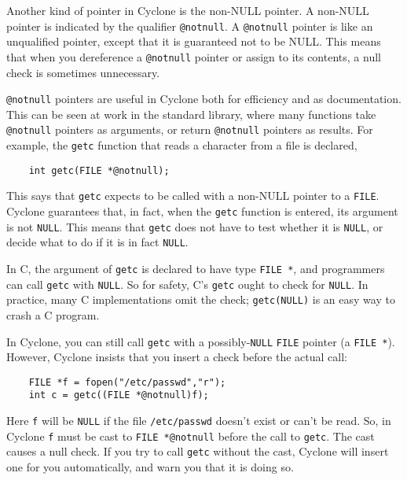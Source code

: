 Another kind of pointer in Cyclone is the non-NULL pointer.
A non-NULL pointer is indicated by the qualifier \texttt{@notnull}.  A
\texttt{@notnull} pointer is like an unqualified pointer, except that it is
guaranteed not to be NULL\@.  This means that when you dereference a
\texttt{@notnull} pointer or assign to its contents, a null check is
sometimes unnecessary.

\texttt{@notnull} pointers are useful in Cyclone both for efficiency and as
documentation.  This can be seen at work in the standard library,
where many functions take \texttt{@notnull} pointers as arguments, or return
\texttt{@notnull} pointers as results.  For example, the \texttt{getc}
function that reads a character from a file is declared,
\begin{verbatim}
    int getc(FILE *@notnull);
\end{verbatim}
This says that \texttt{getc} expects to be called with a non-NULL
pointer to a \texttt{FILE}\@.  Cyclone guarantees that, in fact, when
the \texttt{getc} function is entered, its argument is not \texttt{NULL}.  
This means that \texttt{getc} does not have to test whether it is 
\texttt{NULL}, or decide what to do if it is in fact \texttt{NULL}\@.

In C, the argument of \texttt{getc} is declared to have type
\texttt{FILE *}, and programmers can call \texttt{getc} with
\texttt{NULL}\@.  So for safety, C's \texttt{getc} ought to check for
\texttt{NULL}\@.  In practice, many C implementations omit the check;
\texttt{getc(NULL)} is an easy way to crash a C program.

In Cyclone, you can still call \texttt{getc} with a possibly-\texttt{NULL}
\texttt{FILE} pointer (a \texttt{FILE *}).  However, Cyclone insists
that you insert a check before the actual call:
\begin{verbatim}
    FILE *f = fopen("/etc/passwd","r");
    int c = getc((FILE *@notnull)f);
\end{verbatim}
Here \texttt{f} will be \texttt{NULL} if the file \texttt{/etc/passwd}
doesn't exist or can't be read.  So, in Cyclone \texttt{f} must be
cast to \texttt{FILE *@notnull} before the call to \texttt{getc}.  The
cast causes a null check.  If you try to call \texttt{getc} without
the cast, Cyclone will insert one for you automatically, and warn you
that it is doing so.

